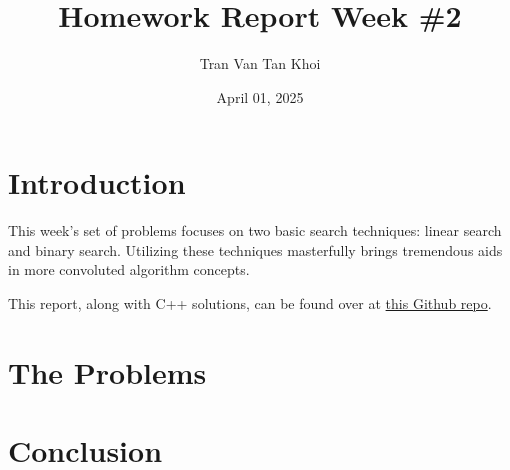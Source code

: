 \documentclass{article}
\author{Tran Van Tan Khoi}
\title{Homework Report Week \#2}
\date{April 01, 2025}
\begin{document}
    \maketitle

    \section{Introduction}
    
    This week's set of problems focuses on two basic search techniques: linear search and binary search. Utilizing these techniques masterfully brings tremendous aids in more convoluted algorithm concepts.


    This report, along with C++ solutions, can be found over at \href{https://github.com/xtrkoi/throwaway-rep}{this Github repo}.


    \section{The Problems}



   
    \section{Conclusion}

    
\end{document}
